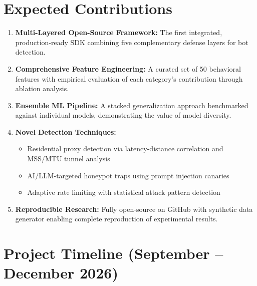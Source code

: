 \documentclass[12pt, a4paper]{article}
\begin{document}
\section{Expected Contributions}

\begin{enumerate}[leftmargin=*, label=\textbf{EC\arabic*.}]
    \item \textbf{Multi-Layered Open-Source Framework:} The first integrated, production-ready SDK combining five complementary defense layers for bot detection.
    \item \textbf{Comprehensive Feature Engineering:} A curated set of 50 behavioral features with empirical evaluation of each category's contribution through ablation analysis.
    \item \textbf{Ensemble ML Pipeline:} A stacked generalization approach benchmarked against individual models, demonstrating the value of model diversity.
    \item \textbf{Novel Detection Techniques:}
    \begin{itemize}
        \item Residential proxy detection via latency-distance correlation and MSS/MTU tunnel analysis
        \item AI/LLM-targeted honeypot traps using prompt injection canaries
        \item Adaptive rate limiting with statistical attack pattern detection
    \end{itemize}
    \item \textbf{Reproducible Research:} Fully open-source on GitHub with synthetic data generator enabling complete reproduction of experimental results.
\end{enumerate}

\section{Project Timeline (September -- December 2026)}
\end{document}

